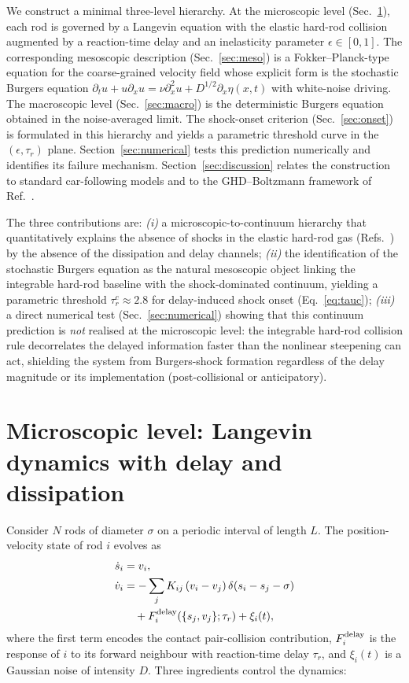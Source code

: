 \documentclass[aps,pre,twocolumn,superscriptaddress,longbibliography,floatfix]{revtex4-2}
\begin{document}
We construct a minimal three-level hierarchy. At the
microscopic level (Sec.~\ref{sec:micro}), each rod is governed
by a Langevin equation with the elastic hard-rod collision
augmented by a reaction-time delay and an inelasticity
parameter $\epsilon\in[0,1]$. The corresponding mesoscopic
description (Sec.~\ref{sec:meso}) is a Fokker--Planck-type
equation for the coarse-grained velocity field whose explicit
form is the stochastic Burgers equation
$\partial_t u + u\partial_x u = \nu\partial_x^2 u +
D^{1/2}\partial_x\eta(x,t)$ with white-noise driving.
The macroscopic level (Sec.~\ref{sec:macro}) is the
deterministic Burgers equation obtained in the noise-averaged
limit. The shock-onset criterion (Sec.~\ref{sec:onset}) is
formulated in this hierarchy and yields a parametric threshold
curve in the $(\epsilon, \tau_r)$ plane.
Section~\ref{sec:numerical} tests this prediction
numerically and identifies its failure mechanism.
Section~\ref{sec:discussion} relates the construction to
standard car-following models and to the GHD--Boltzmann
framework of Ref.~\cite{PaperIV}.

The three contributions are:
\emph{(i)} a microscopic-to-continuum hierarchy that
quantitatively explains the absence of shocks in the elastic
hard-rod gas (Refs.~\cite{PaperIII,PaperIV}) by the absence
of the dissipation and delay channels;
\emph{(ii)} the identification of the stochastic Burgers
equation as the natural mesoscopic object linking the
integrable hard-rod baseline with the shock-dominated
continuum, yielding a parametric threshold
$\tau_r^c\approx 2.8$ for delay-induced shock onset
(Eq.~\eqref{eq:tauc});
\emph{(iii)} a direct numerical test
(Sec.~\ref{sec:numerical}) showing that this continuum
prediction is \emph{not} realised at the microscopic level:
the integrable hard-rod collision rule decorrelates the
delayed information faster than the nonlinear steepening can
act, shielding the system from Burgers-shock formation
regardless of the delay magnitude or its implementation
(post-collisional or anticipatory).

\section{Microscopic level: Langevin dynamics with delay
and dissipation}\label{sec:micro}

Consider $N$ rods of diameter $\sigma$ on a periodic interval
of length $L$. The position-velocity state of rod $i$ evolves
as
\begin{align}
\dot s_i &= v_i, \label{eq:micro1}\\
\dot v_i &= -\sum_j K_{ij}\,(v_i-v_j)\,\delta(s_i-s_j-\sigma)
            \nonumber\\
         &\quad + F_i^{\rm delay}(\{s_j,v_j\};\tau_r)
                + \xi_i(t), \label{eq:micro2}
\end{align}
where the first term encodes the contact pair-collision
contribution, $F_i^{\rm delay}$ is the response of $i$ to its
forward neighbour with reaction-time delay $\tau_r$, and
$\xi_i(t)$ is a Gaussian noise of intensity $D$. Three
ingredients control the dynamics:
\end{document}
